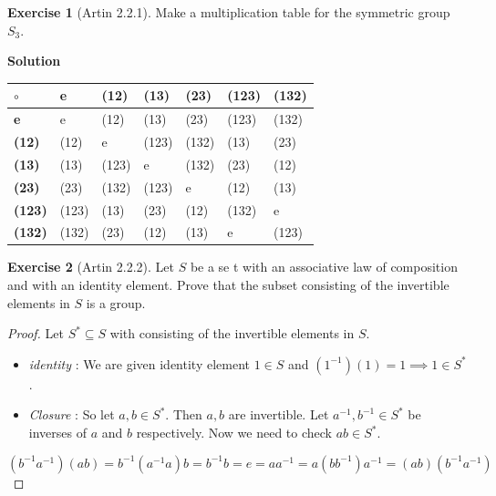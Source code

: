 \documentclass[
]{book}
\theoremstyle{definition}
\theoremstyle{definition}
\theoremstyle{definition}
\newtheorem{exercise}{Exercise}[chapter]
\theoremstyle{definition}
\theoremstyle{remark}
\begin{document}
\begin{exercise}[Artin 2.2.1]
\protect\hypertarget{exr:unnamed-chunk-69}{}\label{exr:unnamed-chunk-69}Make a multiplication table for the symmetric group \(S_3\).
\end{exercise}

\textbf{Solution}

\begin{longtable}[]{@{}lllllll@{}}
\toprule\noalign{}
\(\circ\) & \textbf{e} & (12) & (13) & (23) & (123) & (132) \\
\midrule\noalign{}
\endhead
\bottomrule\noalign{}
\endlastfoot
\textbf{e} & e & (12) & (13) & (23) & (123) & (132) \\
\textbf{(12)} & (12) & e & (123) & (132) & (13) & (23) \\
\textbf{(13)} & (13) & (123) & e & (132) & (23) & (12) \\
\textbf{(23)} & (23) & (132) & (123) & e & (12) & (13) \\
\textbf{(123)} & (123) & (13) & (23) & (12) & (132) & e \\
\textbf{(132)} & (132) & (23) & (12) & (13) & e & (123) \\
\end{longtable}

\begin{exercise}[Artin 2.2.2]
\protect\hypertarget{exr:unnamed-chunk-70}{}\label{exr:unnamed-chunk-70}Let \(S\) be a se t with an associative law of composition and with an identity element. Prove that the subset consisting of the invertible elements in \(S\) is a group.
\end{exercise}

\begin{proof}
Let \(S^*\subseteq S\) with consisting of the invertible elements in \(S\).

\begin{itemize}
\item
  \emph{identity} : We are given identity element \(1 \in S\) and \((1^{-1})(1)=1 \implies 1 \in S^*\).
\item
  \emph{Closure} :
  So let \(a,b\in S^*\). Then \(a,b\) are invertible. Let \(a^{-1},b^{-1}\in S^*\) be inverses of \(a\) and \(b\) respectively. Now we need to check \(ab\in S^*\).\\
\end{itemize}

\[(b^{-1}a^{-1})(ab)=b^{-1}(a^{-1}a)b=b^{-1}b=e=
  aa^{-1}=a(bb^{-1})a^{-1}=(ab)(b^{-1}a^{-1})\]
\end{proof}
\end{document}
